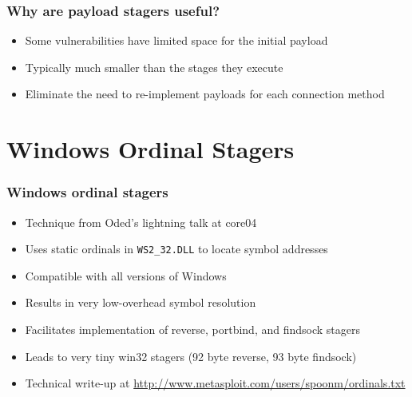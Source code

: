 \documentclass{beamer}
\newenvironment{sitemize}{\vspace{1mm}\begin{itemize}\itemsep 4pt\small}{\end{itemize}}
\begin{document}
\begin{frame}[t]
    \frametitle{Why are payload stagers useful?}

    \begin{sitemize}
        \item Some vulnerabilities have limited space for the
        initial payload
        \item Typically much smaller than the stages
        they execute
        \item Eliminate the need to re-implement payloads for each
        connection method
    \end{sitemize}
\end{frame}

\section{Windows Ordinal Stagers}
\begin{frame}[t]
    \frametitle{Windows ordinal stagers}

    \begin{sitemize}
        \item Technique from Oded's lightning talk at core04
        \item Uses static ordinals in \texttt{WS2\_32.DLL} to locate symbol
        addresses
        \item Compatible with all versions of Windows
        \item Results in very low-overhead symbol resolution
        \item Facilitates implementation of reverse, portbind, and
        findsock stagers
        \item Leads to very tiny win32 stagers (92 byte reverse, 93
        byte findsock)
        \item Technical write-up at
        \footnotesize{\url{http://www.metasploit.com/users/spoonm/ordinals.txt}}
    \end{sitemize}
\end{frame}
\end{document}
